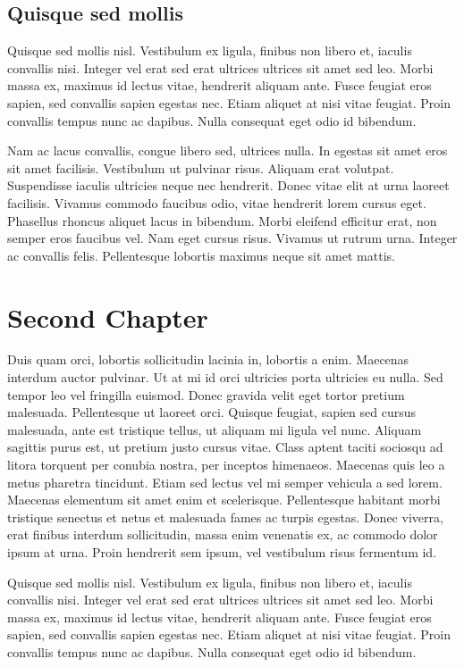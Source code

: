 \documentclass[a4paper,10pt]{report}
\begin{document}
\section{Quisque sed mollis}

Quisque sed mollis nisl. Vestibulum ex ligula, finibus non libero et, iaculis convallis nisi.
Integer vel erat sed erat ultrices ultrices sit amet sed leo. Morbi massa ex, maximus id lectus vitae,
hendrerit aliquam ante. Fusce feugiat eros sapien, sed convallis sapien egestas nec. Etiam aliquet at
nisi vitae feugiat. Proin convallis tempus nunc ac dapibus. Nulla consequat eget odio id bibendum.

Nam ac lacus convallis, congue libero sed, ultrices nulla. In egestas sit amet eros sit amet facilisis.
Vestibulum ut pulvinar risus. Aliquam erat volutpat. Suspendisse iaculis ultricies neque nec hendrerit.
Donec vitae elit at urna laoreet facilisis. Vivamus commodo faucibus odio, vitae hendrerit lorem cursus eget.
Phasellus rhoncus aliquet lacus in bibendum. Morbi eleifend efficitur erat, non semper eros faucibus vel.
Nam eget cursus risus. Vivamus ut rutrum urna. Integer ac convallis felis.
Pellentesque lobortis maximus neque sit amet mattis.

\chapter{Second Chapter}

Duis quam orci, lobortis sollicitudin lacinia in, lobortis a enim. Maecenas interdum auctor pulvinar.
Ut at mi id orci ultricies porta ultricies eu nulla. Sed tempor leo vel fringilla euismod. Donec gravida velit
eget tortor pretium malesuada. Pellentesque ut laoreet orci. Quisque feugiat, sapien sed cursus malesuada,
ante est tristique tellus, ut aliquam mi ligula vel nunc. Aliquam sagittis purus est, ut pretium justo cursus vitae.
Class aptent taciti sociosqu ad litora torquent per conubia nostra, per inceptos himenaeos.
Maecenas quis leo a metus pharetra tincidunt. Etiam sed lectus vel mi semper vehicula a sed lorem.
Maecenas elementum sit amet enim et scelerisque.
Pellentesque habitant morbi tristique senectus et netus et malesuada fames ac turpis egestas.
Donec viverra, erat finibus interdum sollicitudin, massa enim venenatis ex, ac commodo dolor ipsum at urna.
Proin hendrerit sem ipsum, vel vestibulum risus fermentum id.

Quisque sed mollis nisl. Vestibulum ex ligula, finibus non libero et, iaculis convallis nisi.
Integer vel erat sed erat ultrices ultrices sit amet sed leo. Morbi massa ex, maximus id lectus vitae,
hendrerit aliquam ante. Fusce feugiat eros sapien, sed convallis sapien egestas nec. Etiam aliquet at
nisi vitae feugiat. Proin convallis tempus nunc ac dapibus. Nulla consequat eget odio id bibendum.
\end{document}
